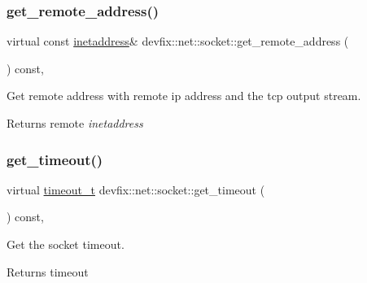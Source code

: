 \subsubsection{\texorpdfstring{get\+\_\+remote\+\_\+address()}{get\_remote\_address()}}
{\footnotesize\ttfamily virtual const \hyperlink{structdevfix_1_1net_1_1inetaddress}{inetaddress}\& devfix\+::net\+::socket\+::get\+\_\+remote\+\_\+address (\begin{DoxyParamCaption}{ }\end{DoxyParamCaption}) const\hspace{0.3cm}{\ttfamily [pure virtual]}, {\ttfamily [noexcept]}}



Get remote address with remote ip address and the tcp output stream. 

\begin{DoxyReturn}{Returns}
remote {\itshape inetaddress} 
\end{DoxyReturn}
\mbox{\label{structdevfix_1_1net_1_1socket_afac86b6ad30a758ce590e7a144764967}} 
\subsubsection{\texorpdfstring{get\+\_\+timeout()}{get\_timeout()}}
{\footnotesize\ttfamily virtual \hyperlink{structdevfix_1_1net_1_1socket_a80a3bf4cb7292bae31ea9c6575539c68}{timeout\+\_\+t} devfix\+::net\+::socket\+::get\+\_\+timeout (\begin{DoxyParamCaption}{ }\end{DoxyParamCaption}) const\hspace{0.3cm}{\ttfamily [pure virtual]}, {\ttfamily [noexcept]}}



Get the socket timeout. 

\begin{DoxyReturn}{Returns}
timeout 
\end{DoxyReturn}
\mbox{\label{structdevfix_1_1net_1_1socket_a3fa8d7dcd44e7740b29ad6674005eb5d}} 
